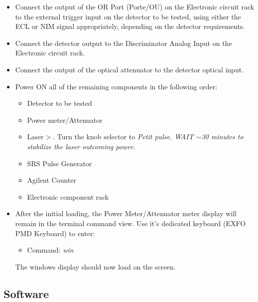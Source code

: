 \documentclass{article}
\begin{document}
\begin{itemize}

\item
Connect the output of the OR Port (Porte/OU) on the Electronic circuit rack to the external trigger input on the detector to be tested, using either the ECL or NIM signal appropriately, depending on the detector requirements.

\item
Connect the detector output to the Discriminator Analog Input on the Electronic circuit rack.

\item
Connect the output of the optical attenuator to the detector optical input. 

\item
Power ON all of the remaining components in the following order:

\begin{itemize}
\item{Detector to be tested}
\item{Power meter/Attenuator}
\item{Laser$>$. Turn the knob selector to \it{Petit pulse}. WAIT $\sim$30 minutes to stabilize the laser outcoming power.}
\item{SRS Pulse Generator}
\item{Agilent Counter}
\item{Electronic component rack}
\end{itemize}

\item
After the initial loading, the Power Meter/Attenuator meter display will remain in the terminal command view. Use it's dedicated keyboard (EXFO PMD Keyboard) to enter:

\begin{itemize}

\item
Command: \emph{win}
\end{itemize}
The windows display should now load on the screen. 

\end{itemize}


\subsection{Software}


\end{document}
